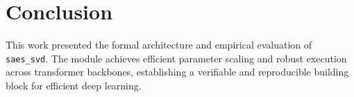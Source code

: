 \section{Conclusion}
This work presented the formal architecture and empirical evaluation of \texttt{saes_svd}. The module achieves efficient parameter scaling and robust execution across transformer backbones, establishing a verifiable and reproducible building block for efficient deep learning.
